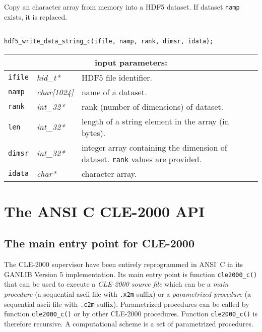 Copy an character array from memory into a HDF5 dataset.  If dataset {\tt namp} exists, it is replaced.

\begin{verbatim}

hdf5_write_data_string_c(ifile, namp, rank, dimsr, idata);
\end{verbatim}

\noindent
\begin{tabular}{|p{1.5cm}|p{2cm}|p{11cm}|}
\hline
\multicolumn{3}{|c|}{\bf input parameters:} \\
\hline
{\tt ifile} & {\it hid\_t*} & HDF5 file identifier. \\
\hline
{\tt namp} & {\it char[1024]} & name of a dataset. \\
\hline
{\tt rank} & {\it int\_32*} & rank (number of dimensions) of dataset. \\
\hline
{\tt len} & {\it int\_32*} & length of a string element in the array (in bytes). \\
\hline
{\tt dimsr} & {\it int\_32*} & integer array containing the dimension of dataset. {\tt rank} values are provided. \\
\hline
{\tt idata} & {\it char*} & character array. \\
\hline
\end{tabular}

\clearpage

\section {The ANSI C CLE-2000 API}\label{sect:cle2000apiC}

\subsection {The main entry point for CLE-2000}

The CLE-2000 supervisor have been entirely reprogrammed in ANSI~C in its GANLIB Version 5 implementation. Its main entry
point is function {\tt cle2000\_c()} that can be used to execute a {\sl CLE-2000 source file} which can be a {\sl main procedure}
(a sequential {\sc ascii} file with {\tt .x2m} suffix) or a {\sl parametrized procedure} (a sequential {\sc ascii} file with {\tt .c2m} suffix).
Parametrized procedures can be called by function {\tt cle2000\_c()} or by other CLE-2000 procedures. Function {\tt cle2000\_c()} is therefore 
recursive. A computational scheme is a set of parametrized procedures.

